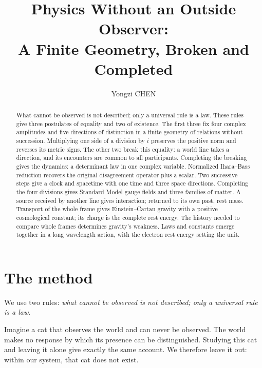 \documentclass[aps,prx,reprint,longbibliography]{revtex4-2}
\begin{document}
\title{Physics Without an Outside Observer:\\ A Finite Geometry, Broken and Completed}
\author{Yongzi CHEN}
\begin{abstract}
What cannot be observed is not described; only a universal rule is a law. These rules give three postulates of equality and two of existence. The first three fix four complex amplitudes and five directions of distinction in a finite geometry of relations without succession. Multiplying one side of a division by $i$ preserves the positive norm and reverses its metric signs. The other two break this equality: a world line takes a direction, and its encounters are common to all participants. Completing the breaking gives the dynamics: a determinant law in one complex variable. Normalized Ihara--Bass reduction recovers the original disagreement operator plus a scalar. Two successive steps give a clock and spacetime with one time and three space directions. Completing the four divisions gives Standard Model gauge fields and three families of matter. A source received by another line gives interaction; returned to its own past, rest mass. Transport of the whole frame gives Einstein--Cartan gravity with a positive cosmological constant; its charge is the complete rest energy. The history needed to compare whole frames determines gravity's weakness. Laws and constants emerge together in a long wavelength action, with the electron rest energy setting the unit.
\end{abstract}
\maketitle

\section{The method}
\label{sec:method}

We use two rules: \emph{what cannot be observed is not described; only a universal rule is a law}.

Imagine a cat that observes the world and can never be observed. The world makes no response by which its presence can be distinguished. Studying this cat and leaving it alone give exactly the same account. We therefore leave it out: within our system, that cat does not exist.
\end{document}
